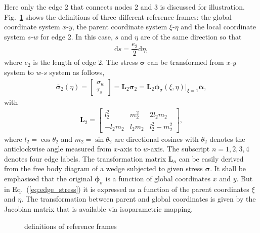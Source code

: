 \documentclass[3p,review,sort&compress,11pt,fleqn]{elsarticle}
\newcommand*{\md}[1]{\mathrm{d}#1}
\newcommand*{\figref}[1]{Fig.~\ref{#1}}
\newcommand*{\eqsref}[1]{Eq.~(\ref{#1})}
\newcommand*{\mathbold}{\bm}
\begin{document}
Here only the edge 2 that connects nodes 2 and 3 is discussed for illustration. \figref{fig:reference_frame} shows the definitions of three different reference frames: the global coordinate system $x$-$y$, the parent coordinate system $\xi$-$\eta$ and the local coordinate system $s$-$w$ for edge 2. In this case, $s$ and $\eta$ are of the same direction so that
\begin{gather*}
\md{s}=\dfrac{e_2}{2}\md{\eta},
\end{gather*}
where $e_2$ is the length of edge 2. The stress $\mathbold{\sigma}$ can be transformed from $x$-$y$ system to $w$-$s$ system as follows,
\begin{gather}\label{eq:edge_stress}
\bar{\mathbold{\sigma}}_2\left(\eta\right)=\begin{bmatrix}
\sigma_w\\\tau_s
\end{bmatrix}=\mathbold{L}_2\mathbold{\sigma}_2=\mathbold{L}_2\mathbold{\phi}_\sigma\left(\xi,\eta\right)\Big|_{\xi=1}\mathbold{\alpha},
\end{gather}
with
\begin{gather}
\mathbold{L}_2=\begin{bmatrix}
l^2_2&m^2_2&2l_2m_2\\
-l_2m_2&l_2m_2&l^2_2-m^2_2
\end{bmatrix},
\end{gather}
where $l_2=\cos\theta_2$ and $m_2=\sin\theta_2$ are directional cosines with $\theta_2$ denotes the anticlockwise angle measured from $x$-axis to $w$-axis. The subscript $n=1,2,3,4$ denotes four edge labels. The transformation matrix $\mathbold{L}_n$ can be easily derived from the free body diagram of a wedge subjected to given stress $\mathbold{\sigma}$. It shall be emphasised that the original $\mathbold{\phi}_\sigma$ is a function of global coordinates $x$ and $y$. But in \eqsref{eq:edge_stress} it is expressed as a function of the parent coordinates $\xi$ and $\eta$. The transformation between parent and global coordinates is given by the Jacobian matrix that is available via isoparametric mapping.
\begin{figure}[htb]
\footnotesize\centering{}
\caption{definitions of reference frames}\label{fig:reference_frame}
\end{figure}
\end{document}
